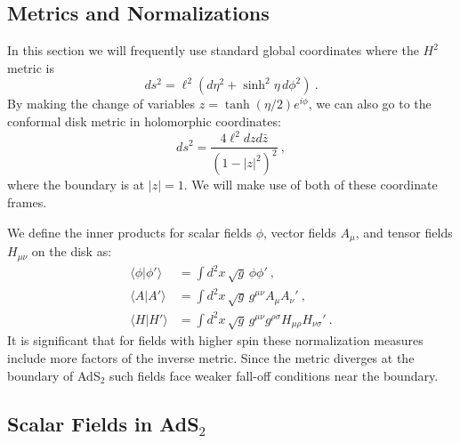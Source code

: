 \documentclass[12pt]{article}
\newcommand{\bz}{\bar{z}}
\begin{document}
\subsection{Metrics and Normalizations}

In this section we will frequently use standard global coordinates where the $H^2$ metric is
%
\begin{equation}
	ds^2 = \ell^2\left(d \eta^2 + \sinh^2\eta\,d\phi^2\right)~.
\label{eq:dsh2}
\end{equation}
By making the change of variables $z = \tanh(\eta/2)e^{i\phi}$, we can also go to the conformal disk metric in holomorphic coordinates:
\begin{equation}
	ds^2 = \frac{4 \ell^2 dz d\bz}{\left(1- |z|^2\right)^2}~,
\end{equation}
where the boundary is at $|z| = 1$.  We will make use of both of these coordinate frames.  

We define the inner products for scalar fields $\phi$, vector fields $A_\mu$, and tensor fields $H_{\mu\nu}$ on the disk as:
\begin{equation}\begin{aligned}
\label{eqn:normalize}
	\langle \phi | \phi' \rangle &= \int d^2x\,\sqrt{g}\, \phi \phi'~, \\
	\langle A | A' \rangle &= \int d^2x\,\sqrt{g}\, g^{\mu\nu} A_\mu A_\nu'~, \\
	\langle H | H'\rangle &= \int d^2x \, \sqrt{g}\, g^{\mu\nu} g^{\rho \sigma} H_{\mu\rho} H_{\nu\sigma}'~.
\end{aligned}\end{equation}
It is significant that for fields with higher spin these normalization measures  include more factors of the inverse metric. Since the metric diverges at the boundary of AdS$_2$ such fields face weaker fall-off conditions near the boundary. 

\subsection{Scalar Fields in \texorpdfstring{AdS$_2$}{AdS2}}
\label{sec:quant:clas}
\end{document}
